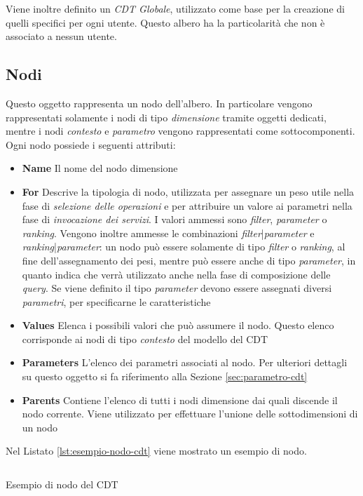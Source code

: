 Viene inoltre definito un \emph{CDT Globale}, utilizzato come base per la creazione di quelli specifici per ogni utente. Questo albero ha la particolarità che non è associato a nessun utente.

\subsection{Nodi\label{sec:nodo-cdt}}

Questo oggetto rappresenta un nodo dell'albero. In particolare vengono rappresentati solamente i nodi di tipo \emph{dimensione} tramite oggetti dedicati, mentre i nodi \emph{contesto} e \emph{parametro} vengono rappresentati come sottocomponenti. Ogni nodo possiede i seguenti attributi:

\begin{itemize}
	\item \textbf{Name}
	Il nome del nodo dimensione
	\item \textbf{For}
	Descrive la tipologia di nodo, utilizzata per assegnare un peso utile nella fase di \emph{selezione delle operazioni} e per attribuire un valore ai parametri nella fase di \emph{invocazione dei servizi}. I valori ammessi sono \emph{filter}, \emph{parameter} o \emph{ranking}. Vengono inoltre ammesse le combinazioni \emph{filter}|\emph{parameter} e \emph{ranking}|\emph{parameter}: un nodo può essere solamente di tipo \emph{filter} o \emph{ranking}, al fine dell'assegnamento dei pesi, mentre può essere anche di tipo \emph{parameter}, in quanto indica che verrà utilizzato anche nella fase di composizione delle \emph{query}. Se viene definito il tipo \emph{parameter} devono essere assegnati diversi \emph{parametri}, per specificarne le caratteristiche
	\item \textbf{Values}
	Elenca i possibili valori che può assumere il nodo. Questo elenco corrisponde ai nodi di tipo \emph{contesto} del modello del CDT
	\item \textbf{Parameters}
	L'elenco dei parametri associati al nodo. Per ulteriori dettagli su questo oggetto si fa riferimento alla Sezione \ref{sec:parametro-cdt}
	\item \textbf{Parents}
	Contiene l'elenco di tutti i nodi dimensione dai quali discende il nodo corrente. Viene utilizzato per effettuare l'unione delle sottodimensioni di un nodo
\end{itemize}

Nel Listato \ref{lst:esempio-nodo-cdt} viene mostrato un esempio di nodo.

\begin{listing}[h]
	\inputminted{json}{5-implementazione-backend/Codice/esempio_nodo_cdt.json}
	\caption{Esempio di nodo del CDT}
	\label{lst:esempio-nodo-cdt}
\end{listing}

